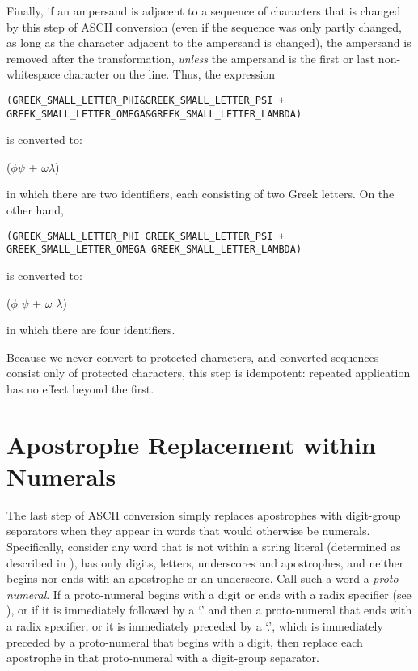 Finally,
if an ampersand is adjacent to a sequence of characters
that is changed by this step of ASCII conversion
(even if the sequence was only partly changed,
as long as the character adjacent to the ampersand is changed),
the ampersand is removed after the transformation,
\emph{unless} the ampersand is the first
or last non-whitespace character on the line.
Thus, the expression
\begin{verbatim}
(GREEK_SMALL_LETTER_PHI&GREEK_SMALL_LETTER_PSI +
GREEK_SMALL_LETTER_OMEGA&GREEK_SMALL_LETTER_LAMBDA)
\end{verbatim}

is converted to:

\begin{ttt}
($\phi\psi$ +
$\omega\lambda$)
\end{ttt}

in which there are two identifiers,
each consisting of two Greek letters.
On the other hand,

\begin{verbatim}
(GREEK_SMALL_LETTER_PHI GREEK_SMALL_LETTER_PSI +
GREEK_SMALL_LETTER_OMEGA GREEK_SMALL_LETTER_LAMBDA)
\end{verbatim}

is converted to:

\begin{ttt}
($\phi$ $\psi$ +
$\omega$ $\lambda$)
\end{ttt}

in which there are four identifiers.

Because we never convert to protected characters,
and converted sequences consist only of protected characters,
this step is idempotent:
repeated application has no effect beyond the first.


\section{Apostrophe Replacement within Numerals}

The last step of ASCII conversion simply replaces
apostrophes with digit-group separators
when they appear in words that would otherwise be numerals.
Specifically,
consider any word that is not within a string literal
(determined as described in ),
has only digits, letters, underscores
and apostrophes,
and neither begins nor ends with an apostrophe or an underscore.
Call such a word a \emph{proto-numeral}.
If a proto-numeral begins with a digit
or ends with a radix specifier
(see ),
or if it is immediately followed by a `.'
and then a proto-numeral that ends with a radix specifier,
or it is immediately preceded by a `.',
which is immediately preceded by a proto-numeral
that begins with a digit,
then replace each apostrophe in that proto-numeral
with a digit-group separator.

